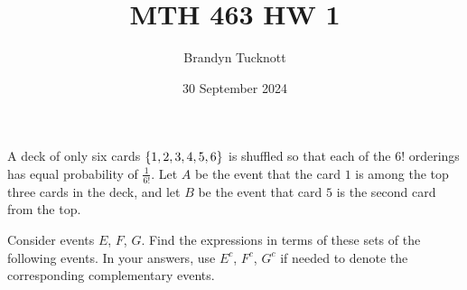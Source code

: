 \documentclass{exam}
\title{MTH 463 HW 1}
\author{Brandyn Tucknott}
\date{30 September 2024}
\begin{document}
\maketitle

\begin{questions}
    \question
A deck of only six cards $\left \{ 1, 2, 3, 4, 5, 6 \right \}$ is shuffled so that each of the 6! orderings has equal probability of $\frac{1}{6!}$. Let $A$ be the event that the card $1$ is among the top three cards in the deck, and let $B$ be the event that card $5$ is the second card from the top.

\newpage
\question
Consider events $E$, $F$, $G$. Find the expressions in terms of these sets of the following events. In your answers, use $E^c$, $F^c$, $G^c$ if needed to denote the corresponding complementary events.
\end{questions}
\end{document}
